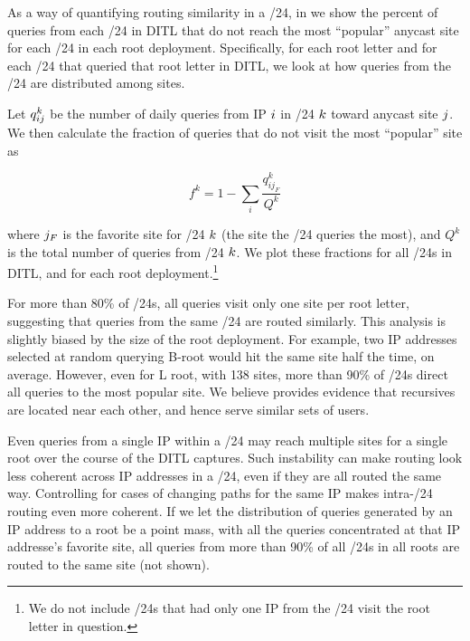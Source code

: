 \documentclass[sigconf,letterpaper,nonacm,10pt,anonymous]{acmart}
\begin{document}
As a way of quantifying routing similarity in a /24, in
 we show the percent of queries from
each /24 in DITL that do not reach the most ``popular'' anycast site for
each /24 in each root deployment. Specifically, for each root letter and
for each /24 that queried that root letter in DITL, we look at how
queries from the /24 are distributed among sites.

Let \(\mathnormal{q^{k}_{ij}}\) be the number of daily queries from IP
\(\mathnormal{i}\) in /24 \(\mathnormal{k}\) toward anycast site
\(\mathnormal{j}\). We then calculate the fraction of queries that do
not visit the most ``popular'' site as

\begin{equation}
f^k = 1 - \underset{i}{\sum} \frac{q^k_{i j_{F}}}{Q^k} 
\end{equation}

where \(\mathnormal{j_F}\) is the favorite site for /24
\(\mathnormal{k}\) (\ie the site the /24 queries the most), and \(Q^k\)
is the total number of queries from /24 \(\mathnormal{k}\). We plot
these fractions for all /24s in DITL, and for each root
deployment.\footnote{We do not include /24s that had only one IP from
  the /24 visit the root letter in question.}

For more than 80\% of /24s, all queries visit only one site per root
letter, suggesting that queries from the same /24 are routed similarly.
This analysis is slightly biased by the size of the root deployment. For
example, two IP addresses selected at random querying B-root would hit
the same site half the time, on average. However, even for L root, with
138 sites, more than 90\% of /24s direct all queries to the most popular
site. We believe  provides evidence
that recursives are located near each other, and hence serve similar
sets of users.

Even queries from a single IP within a /24 may reach multiple sites for
a single root over the course of the DITL captures. Such instability can
make routing look less coherent across IP addresses in a /24, even if
they are all routed the same way. Controlling for cases of changing
paths for the same IP makes intra-/24 routing even more coherent. If we
let the distribution of queries generated by an IP address to a root be
a point mass, with all the queries concentrated at that IP addresse's
favorite site, all queries from more than 90\% of all /24s in all roots
are routed to the same site (not shown).
\end{document}

